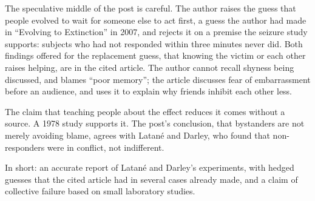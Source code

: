\begin{afterword}
The speculative middle of the post is careful. The author raises the guess that people evolved to wait for someone else to act first, a guess the author had made in ``Evolving to Extinction'' in 2007, and rejects it on a premise the seizure study supports: subjects who had not responded within three minutes never did. Both findings offered for the replacement guess, that knowing the victim or each other raises helping, are in the cited article. The author cannot recall shyness being discussed, and blames ``poor memory''; the article discusses fear of embarrassment before an audience, and uses it to explain why friends inhibit each other less.

The claim that teaching people about the effect reduces it comes without a source. A 1978 study supports it. The post's conclusion, that bystanders are not merely avoiding blame, agrees with Latané and Darley, who found that non-responders were in conflict, not indifferent.

In short: an accurate report of Latané and Darley's experiments, with hedged guesses that the cited article had in several cases already made, and a claim of collective failure based on small laboratory studies.
\end{afterword}
